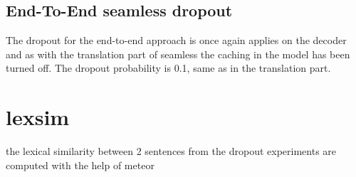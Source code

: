 \subsection{End-To-End seamless dropout}
The dropout for the end-to-end approach is once again applies on the decoder and as with the translation part of seamless the caching in the model has been turned off. The dropout probability is 0.1, same as in the translation part.

\section{lexsim}
the lexical similarity between 2 sentences from the dropout experiments are computed with the help of meteor \cite{banerjee-lavie-2005-meteor}

